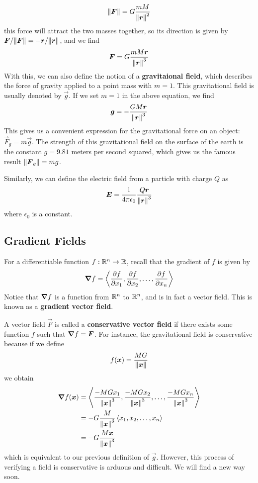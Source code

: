 \[ \norm{\boldsymbol{F}} = G\frac{mM}{\norm{\boldsymbol{r}}^2}\]
this force will attract the two masses together, so its direction is given by $\boldsymbol{F} / \norm{\boldsymbol{F}} = -\boldsymbol{r}/\norm{\boldsymbol{r}}$, and we find
\[ \boldsymbol{F} = G\frac{mM\boldsymbol{r}}{\norm{\boldsymbol{r}}^3}\]
With this, we can also define the notion of a \textbf{gravitaional field}, which describes the force of gravity applied to a point mass with $m=1$. This gravitational field is usually denoted by $\vec g$. If we set $m=1$ in the above equation, we find
\[ \boldsymbol{g} = -\frac{GM\boldsymbol{r}}{\norm{\boldsymbol{r}}^3} \]
This gives us a convenient expression for the gravitational force on an object: $\vec F_g = m\vec g$. The strength of this gravitational field on the surface of the earth is the constant $g=9.81$ meters per second squared, which gives us the famous result $\norm{\boldsymbol{F}_g} = mg$. \par
Similarly, we can define the electric field from a particle with charge $Q$ as
\[ \boldsymbol{E} = \frac{1}{4\pi \epsilon_0}\frac{Q\boldsymbol{r}}{\norm{\boldsymbol{r}}^3}\]
where $\epsilon_0$ is a constant. 
\subsection{Gradient Fields}
For a differentiable function $f: \mathbb{R}^n\to \mathbb{R}$, recall that the gradient of $f$ is given by
\[ \boldsymbol\nabla f = \left\langle \pdv{f}{x_1}, \pdv{f}{x_2}, \dots, \pdv{f}{x_n} \right\rangle \]
Notice that $\boldsymbol\nabla f$ is a function from $\mathbb{R}^n$ to $\mathbb{R}^n$, and is in fact a vector field. This is known as a \textbf{gradient vector field}. \par
A vector field $\vec F$ is called a \textbf{conservative vector field} if there exists some function $f$ such that $\boldsymbol\nabla f = \boldsymbol{F}$. For instance, the gravitational field is conservative because if we define
\[ f(\boldsymbol{x}) = \frac{MG}{\norm{\boldsymbol{x}}}\]
we obtain
\begin{align*}
    \boldsymbol\nabla f(\boldsymbol{x}) &= \left\langle \frac{-MGx_1}{\norm{\boldsymbol{x}}^{3}}, \frac{-MGx_2}{\norm{\boldsymbol{x}}^{3}}, \dots, \frac{-MGx_n}{\norm{\boldsymbol{x}}^{3}}\right\rangle \\
    &= -G\frac{M}{\norm{\boldsymbol{x}}^{3}}\left\langle x_1, x_2, \dots, x_n\right\rangle \\
    &= -G\frac{M\boldsymbol{x}}{\norm{\boldsymbol{x}}^{3}}
\end{align*}
which is equivalent to our previous definition of $\vec g$. However, this process of verifying a field is conservative is arduous and difficult. We will find a new way soon.
